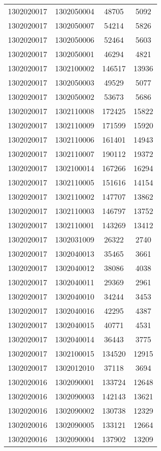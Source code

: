 \begin{longtable}[h]{llcc}
		1302020017 & 1302050004 & 48705 & 5092\\
		1302020017 & 1302050007 & 54214 & 5826\\
		1302020017 & 1302050006 & 52464 & 5603\\
		1302020017 & 1302050001 & 46294 & 4821\\
		1302020017 & 1302100002 & 146517 & 13936\\
		1302020017 & 1302050003 & 49529 & 5077\\
		1302020017 & 1302050002 & 53673 & 5686\\
		1302020017 & 1302110008 & 172425 & 15822\\
		1302020017 & 1302110009 & 171599 & 15920\\
		1302020017 & 1302110006 & 161401 & 14943\\
		1302020017 & 1302110007 & 190112 & 19372\\
		1302020017 & 1302100014 & 167266 & 16294\\
		1302020017 & 1302110005 & 151616 & 14154\\
		1302020017 & 1302110002 & 147707 & 13862\\
		1302020017 & 1302110003 & 146797 & 13752\\
		1302020017 & 1302110001 & 143269 & 13412\\
		1302020017 & 1302031009 & 26322 & 2740\\
		1302020017 & 1302040013 & 35465 & 3661\\
		1302020017 & 1302040012 & 38086 & 4038\\
		1302020017 & 1302040011 & 29369 & 2961\\
		1302020017 & 1302040010 & 34244 & 3453\\
		1302020017 & 1302040016 & 42295 & 4387\\
		1302020017 & 1302040015 & 40771 & 4531\\
		1302020017 & 1302040014 & 36443 & 3775\\
		1302020017 & 1302100015 & 134520 & 12915\\
		1302020017 & 1302012010 & 37118 & 3694\\
		1302020016 & 1302090001 & 133724 & 12648\\
		1302020016 & 1302090003 & 142143 & 13621\\
		1302020016 & 1302090002 & 130738 & 12329\\
		1302020016 & 1302090005 & 133121 & 12664\\
		1302020016 & 1302090004 & 137902 & 13209\\

\end{longtable}
